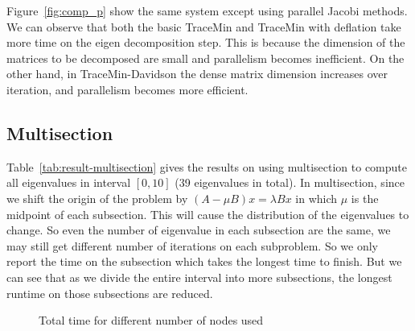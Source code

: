 Figure~\ref{fig:comp_p} show the same system except using parallel Jacobi methods. We can observe that both the
basic TraceMin and TraceMin with deflation take more time on the eigen decomposition step. This is because the
dimension of the matrices to be decomposed are small and parallelism becomes inefficient. On the other hand, in
TraceMin-Davidson the dense matrix dimension increases over iteration, and parallelism becomes more efficient.

\subsection{Multisection}
Table~\ref{tab:result-multisection} gives the results on using multisection to compute all eigenvalues in interval $[0, 10]$ (39 eigenvalues in total). In multisection, since we shift the origin of the problem by $(A - \mu B) x = \lambda B x$ in which $\mu$ is the midpoint of each subsection. This will cause the distribution of the eigenvalues to change. So even the number of eigenvalue in each subsection are the same, we may still get different number of iterations on each subproblem. So we only report the time on the subsection which takes the longest time to finish. But we can see that as we divide the entire interval into more subsections, the longest runtime on those subsections are reduced. 

\begin{figure}[htbp]
	\centering
	\caption{Total time for different number of nodes used}
  \label{fig:timenodes}
\end{figure}

